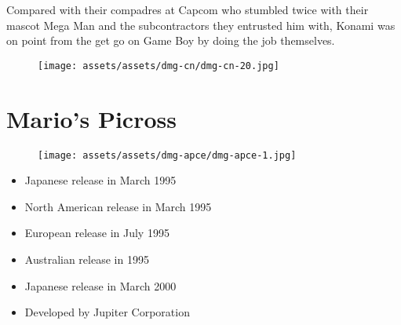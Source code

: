 \documentclass{book}
\begin{document}
Compared with their compadres at Capcom who stumbled twice with their mascot Mega Man and the subcontractors they entrusted him with, Konami was on point from the get go on Game Boy by doing the job themselves.

\begin{figure}[hbt]
\vskip 10pt
\centering \texttt{[image: assets/assets/dmg-cn/dmg-cn-20.jpg]}
\vskip 6pt
\end{figure}



\begingroup \chapter*{Mario’s Picross} \endgroup
\begin{figure}[H]
\vskip 4pt
\centering
\texttt{[image: assets/assets/dmg-apce/dmg-apce-1.jpg]}\end{figure}
\begin{itemize} [nosep]




\item Japanese release in March 1995







\item North American release in March 1995







\item European release in July 1995







\item Australian release in 1995







\item Japanese release in March 2000
































\item Developed by Jupiter Corporation

\end{itemize}\noindent
\end{document}
